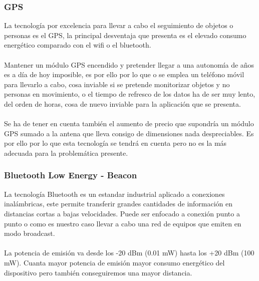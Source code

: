 \documentclass[a4paper ,12pt, onecolumn]{article}
\begin{document}
        \subsubsection {GPS}
            La tecnología por excelencia para llevar a cabo el seguimiento de objetos o personas es el GPS, la principal desventaja
            que presenta es el elevado consumo energético comparado con el wifi o el bluetooth.
            \paragraph{}
            Mantener un módulo GPS encendido y pretender llegar a una autonomía de años es a día de hoy
            imposible, es por ello por lo que o se emplea un teléfono móvil para llevarlo a cabo, cosa inviable si se pretende 
            monitorizar objetos  y no personas en movimiento, o el tiempo de refresco de los datos ha de ser muy lento, del orden de horas,
            cosa de nuevo inviable para la aplicación que se presenta.
            \paragraph{}
            Se ha de tener en cuenta también el aumento de precio que supondría un módulo GPS sumado a la antena que lleva consigo de 
            dimensiones nada despreciables. 
            Es por ello por lo que esta tecnología se tendrá en cuenta pero no es la más adecuada para la problemática presente.
        \subsubsection {Bluetooth Low Energy - Beacon}
            La tecnología Bluetooth es un estandar industrial aplicado a conexiones inalámbricas, este permite transferir 
            grandes cantidades de información en distancias cortas a bajas velocidades. Puede ser enfocado a conexión
            punto a punto o como es nuestro caso llevar a cabo una red de equipos que emiten en modo broadcast.
            \paragraph{}
            La potencia de emisión va desde los -20 dBm (0.01 mW) hasta los +20 dBm (100 mW). Cuanta mayor potencia de emisión mayor consumo energético
            del dispositivo pero también conseguiremos una mayor distancia.
\end{document}
